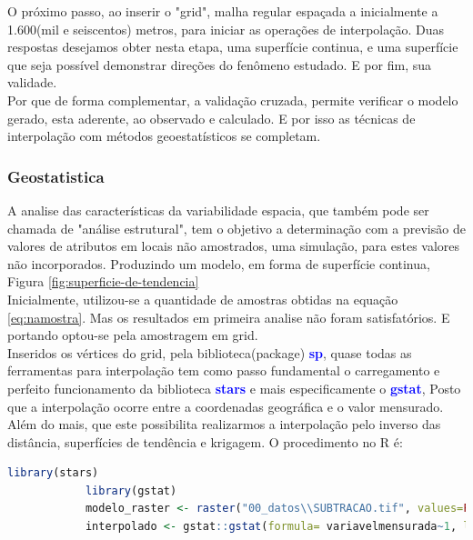 		\hspace*{1.25 cm}  O próximo passo, ao inserir o "grid", malha regular espaçada a inicialmente a 1.600(mil e seiscentos) metros, para iniciar as operações de interpolação. Duas respostas desejamos obter nesta etapa,  uma superfície continua, e uma superfície que seja possível demonstrar direções do fenômeno estudado. E por fim, sua validade. \\
		\hspace*{1.25 cm} Por que de  forma complementar, a validação cruzada, permite  verificar o modelo gerado, esta aderente, ao observado e calculado. E por isso as técnicas de interpolação com métodos geoestatísticos se completam. 
		
		\subsubsection{Geostatistica}
		\hspace*{1.25 cm} A analise das características da variabilidade espacia, que também pode ser chamada de "análise estrutural", tem o objetivo a determinação com a previsão de valores de atributos em locais não amostrados, uma simulação, para estes valores não incorporados. Produzindo um modelo, em forma de superfície continua, Figura \ref{fig:superficie-de-tendencia}\\
\hspace*{1.25 cm} Inicialmente, utilizou-se a quantidade de amostras obtidas na equação \eqref{eq:namostra}. Mas os resultados em primeira analise não foram satisfatórios. E portando optou-se pela amostragem em grid.\\
		\hspace*{1.25 cm} Inseridos os vértices do grid, pela biblioteca(package) \textbf{\textcolor{blue}{sp}}, quase todas as ferramentas para interpolação tem como passo fundamental o carregamento e perfeito funcionamento da biblioteca \textbf{\textcolor{blue}{stars}} e mais especificamente o \textbf{\textcolor{blue}{gstat}}, Posto que a interpolação ocorre entre a coordenadas geográfica e o valor mensurado. Além do mais, que este possibilita realizarmos a interpolação pelo inverso das distância, superfícies de tendência e krigagem.  O procedimento no R é: 
		\lstset{
			language=R, %
			caption= Interpolação em linguagem R,} %
		\begin{lstlisting}[language=R]
			library(stars)
			library(gstat)
			modelo_raster <- raster("00_datos\\SUBTRACAO.tif", values=FALSE)
			interpolado <- gstat::gstat(formula= variavelmensurada~1, locations = arquivodogrid, set = parametrosdomodelo )	   
		\end{lstlisting}  
